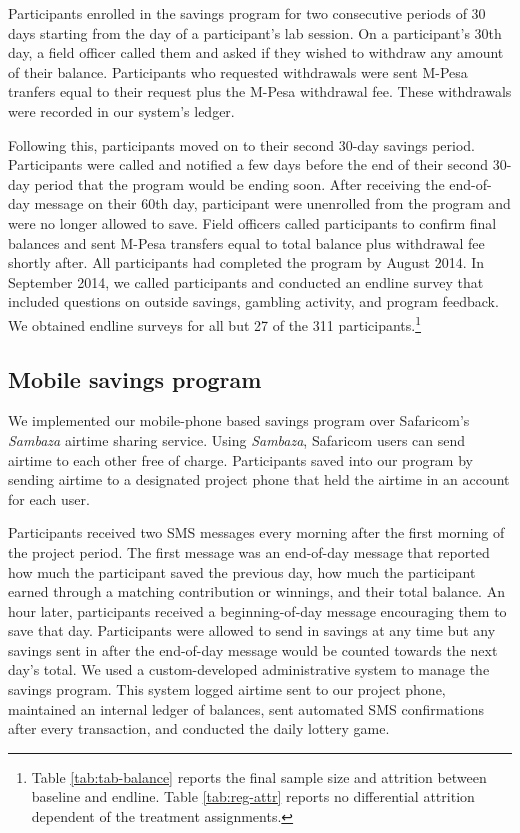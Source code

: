 \documentclass[12pt]{article}
\begin{document}
	 	Participants enrolled in the savings program for two consecutive periods of 30 days starting from the day of a participant's lab session. On a participant's 30th day, a field officer called them and asked if they wished to withdraw any amount of their balance. Participants who requested withdrawals were sent M-Pesa tranfers equal to their request plus the M-Pesa withdrawal fee. These withdrawals were recorded in our system's ledger.

		Following this, participants moved on to their second 30-day savings period. Participants were called and notified a few days before the end of their second 30-day period that the program would be ending soon. After receiving the end-of-day message on their 60th day, participant were unenrolled from the program and were no longer allowed to save. Field officers called participants to confirm final balances and sent M-Pesa transfers equal to total balance plus withdrawal fee shortly after. All participants had completed the program by August 2014. In September 2014, we called participants and conducted an endline survey that included questions on outside savings, gambling activity, and program feedback. We obtained endline surveys for all but 27 of the 311 participants.\footnote{Table \ref{tab:tab-balance} reports the final sample size and attrition between baseline and endline. Table \ref{tab:reg-attr} reports no differential attrition dependent of the treatment assignments.}

	\subsection{Mobile savings program}

		We implemented our mobile-phone based savings program over Safaricom's \textit{Sambaza} airtime sharing service. Using \textit{Sambaza}, Safaricom users can send airtime to each other free of charge. Participants saved into our program by sending airtime to a designated project phone that held the airtime in an account for each user.

		Participants received two SMS messages every morning after the first morning of the project period. The first message was an end-of-day message that reported how much the participant saved the previous day, how much the participant earned through a matching contribution or winnings, and their total balance. An hour later, participants received a beginning-of-day message encouraging them to save that day. Participants were allowed to send in savings at any time but any savings sent in after the end-of-day message would be counted towards the next day's total. We used a custom-developed administrative system to manage the savings program. This system logged airtime sent to our project phone, maintained an internal ledger of balances, sent automated SMS confirmations after every transaction, and conducted the daily lottery game.
\end{document}
